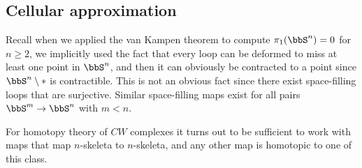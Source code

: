 \subsection{Cellular approximation}


Recall when we applied the van Kampen theorem to compute $\pi_1(\bbS^n)=0$ for $n\geq 2$, we implicitly used the fact that every loop can be deformed to miss at least one point in $\bbS^n$, and then it can obviously be contracted to a point since $\bbS^n\setminus *$ is contractible. This is not an obvious fact since there exist space-filling loops that are surjective. Similar space-filling maps exist for all pairs $\bbS^m\to \bbS^n$ with $m<n$.

For homotopy theory of $CW$ complexes it turns out to be sufficient to work with maps that map $n$-skeleta to $n$-skeleta, and any other map is homotopic to one of this class.



